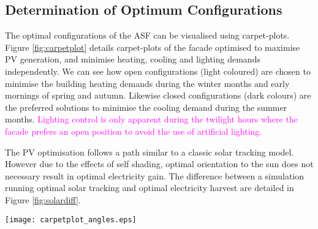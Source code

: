 

\subsection{Determination of Optimum Configurations}

The optimal configurations of the ASF can be visualised using carpet-plots. Figure \ref{fig:carpetplot} details carpet-plots of the facade optimised to maximise PV generation, and minimise heating, cooling and lighting demands independently. We can see how open configurations (light coloured) are chosen to minimise the building heating demands during the winter months and early mornings of spring and autumn. Likewise closed configurations (dark colours) are the preferred solutions to minimise the cooling demand during the summer months. \textcolor{magenta}{Lighting control is only apparent during the twilight hours where the facade prefers an open position to avoid the use of artificial lighting.} 


The PV optimisation follows a path similar to a classic solar tracking model. However due to the effects of self shading, optimal orientation to the sun does not necessary result in optimal electricity gain. The difference between a simulation running optimal solar tracking and optimal electricity harvest are detailed in Figure \ref{fig:solardiff}.



\begin{figure*}
\begin{center}
\texttt{[image: carpetplot\_angles.eps]}
\caption{Carpet plots detailing the optimal configuration to minimise the (a) heating demand, (b) cooling demand, (c) lighting demand, and (d) maximise irradiance on PV panels. Each configuration is represented by an angle of orientation around the x-axis (Altitude) and y-axis (Azimuth) as seen in the legend. Figure (e) details the combinations for optimum building thermal management without PV production. (f) also includes the PV production}
\label{fig:carpetplot}
\end{center}
\end{figure*}

